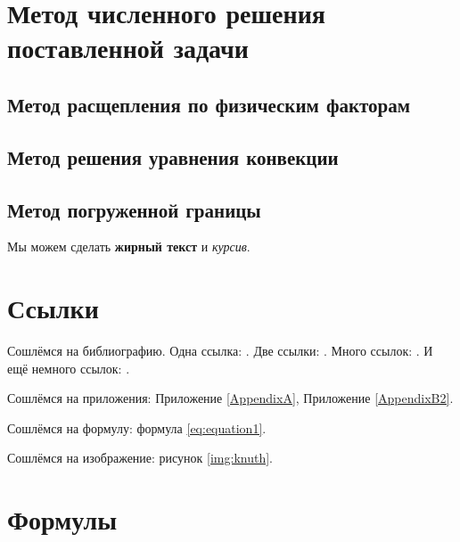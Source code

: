 \section{Метод численного решения поставленной задачи} \label{sect1_3}

\subsection{Метод расщепления по физическим факторам} \label{subsect1_3_1}

\subsection{Метод решения уравнения конвекции} \label{subsect1_3_2}

\subsection{Метод погруженной границы} \label{subsect1_3_3}

Мы можем сделать \textbf{жирный текст} и \textit{курсив}.


\section{Ссылки} \label{sect1_2}
Сошлёмся на библиографию. Одна ссылка: \cite{Sychev}. Две ссылки: \cite{Sokolov,Gaidaenko}. Много ссылок: \cite{Lermontov,Management,Borozda,Marketing,Constitution,FamilyCode,Gost.7.0.53,Razumovski,Lagkueva,Pokrovski,Sirotko,Lukina,Methodology,Encyclopedia,Nasirova,Berestova,Kriger}. И ещё немного ссылок: \cite{Article,Book,Booklet,Conference,Inbook,Incollection,Manual,Mastersthesis,Misc,Phdthesis,Proceedings,Techreport,Unpublished}.

Сошлёмся на приложения: Приложение \ref{AppendixA}, Приложение \ref{AppendixB2}.

Сошлёмся на формулу: формула \eqref{eq:equation1}.

Сошлёмся на изображение: рисунок \ref{img:knuth}.


\section{Формулы} \label{sect1_3}

